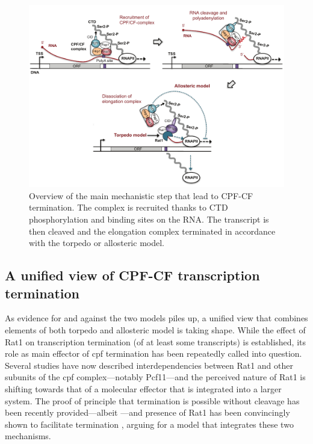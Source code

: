 \begin{figure}[ht]

\centering
\includegraphics[width=\textwidth]{figures/introduction/cpf}
\caption[Mechanism of CPF-CF termination]{Overview of the main mechanistic step that lead to CPF-CF termination. The complex is recruited thanks to CTD phosphorylation and binding sites on the RNA. The transcript is then cleaved and the elongation complex terminated in accordance with the torpedo or allosteric model.}
\label{fig:cpfTermination}

\end{figure}

\subsection{A unified view of CPF-CF transcription termination}

As evidence for and against the two models piles up, a unified view that combines elements of both torpedo and allosteric model is taking shape.
While the effect of Rat1 on transcription termination (of at least some transcripts) is established, its role as main effector of \gls{cpf} termination has been repeatedly called into question.
Several studies have now described interdependencies between Rat1 and other subunits of the \gls{cpf} complex---notably Pcf11---and the perceived nature of Rat1 is shifting towards that of a molecular effector  that is integrated into a larger system.
The proof of principle that termination is possible without cleavage has been recently provided---albeit \invitro{}\cite{zhang:2015:polya}---and presence of Rat1 has been convincingly shown to facilitate termination \cite{fong:2015:effects}, arguing for a model that integrates these two mechanisms.

